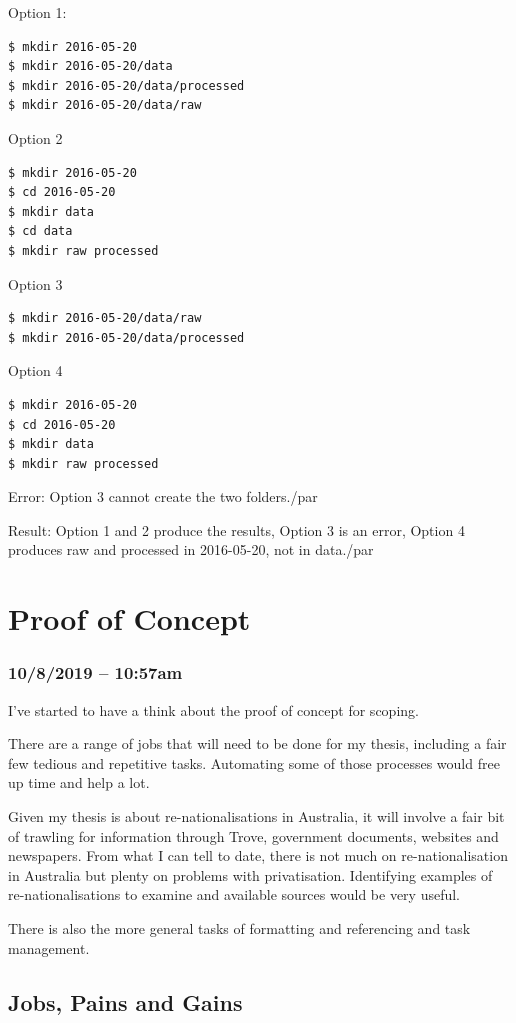 \documentclass{article}
\begin{document}
Option 1:
\begin{verbatim}$ mkdir 2016-05-20
$ mkdir 2016-05-20/data
$ mkdir 2016-05-20/data/processed
$ mkdir 2016-05-20/data/raw\end{verbatim}

Option 2
\begin{verbatim}$ mkdir 2016-05-20
$ cd 2016-05-20
$ mkdir data
$ cd data
$ mkdir raw processed\end{verbatim}

Option 3
\begin{verbatim}$ mkdir 2016-05-20/data/raw
$ mkdir 2016-05-20/data/processed\end{verbatim}

Option 4
\begin{verbatim}$ mkdir 2016-05-20
$ cd 2016-05-20
$ mkdir data
$ mkdir raw processed\end{verbatim}

Error: Option 3 cannot create the two folders./par

Result: Option 1 and 2 produce the results, Option 3 is an error, Option 4 produces raw and processed in 2016-05-20, not in data./par

\newpage
\section{Proof of Concept}
\subsubsection*{10/8/2019 – 10:57am}
I’ve started to have a think about the proof of concept for scoping.\par
There are a range of jobs that will need to be done for my thesis, including a fair few tedious and repetitive tasks. Automating some of those processes would free up time and help a lot.\par
Given my thesis is about re-nationalisations in Australia, it will involve a fair bit of trawling for information through Trove, government documents, websites and newspapers. From what I can tell to date, there is not much on re-nationalisation in Australia but plenty on problems with privatisation. Identifying examples of re-nationalisations to examine and available sources would be very useful.\par
There is also the more general tasks of formatting and referencing and task management.
\subsection{Jobs, Pains and Gains }
\end{document}
